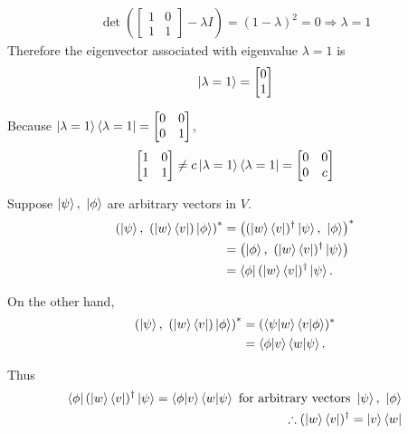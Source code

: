 \begin{align*}
	\det \left(\begin{bmatrix}
	1 & 0 \\ 
	1 & 1
	\end{bmatrix} - \lambda I \right) = (1 - \lambda)^2 = 0 \Rightarrow \lambda = 1
\end{align*}
Therefore the eigenvector associated with eigenvalue $\lambda = 1$ is
\begin{align*}
	\ket{\lambda = 1} = \begin{bmatrix}
	0 \\ 
	1
	\end{bmatrix}
\end{align*}

Because $\ket{\lambda = 1}\bra{\lambda = 1} = \begin{bmatrix}
0 & 0 \\ 
0 & 1
\end{bmatrix}$,
\begin{align*}
	\begin{bmatrix}
	1 & 0 \\ 
	1 & 1
	\end{bmatrix} \neq c\ket{\lambda = 1}\bra{\lambda = 1} = \begin{bmatrix}
	0 & 0 \\ 
	0 & c
	\end{bmatrix}
\end{align*}



Suppose $\ket{\psi},\ \ket{\phi}$ are arbitrary vectors in $V$.
\begin{align*}
	\left(\ket{\psi},\ (\ket{w}\bra{v}) \ket{\phi}\right)^* &=
	\left((\ket{w}\bra{v})^\dagger \ket{\psi},\  \ket{\phi}\right)^*\\
	&= \left(\ket{\phi},\ (\ket{w}\bra{v})^\dagger \ket{\psi} \right)\\
	&= \bra{\phi} (\ket{w}\bra{v})^\dagger \ket{\psi}.
\end{align*}

On the other hand,
\begin{align*}
	\left(\ket{\psi},\ (\ket{w}\bra{v}) \ket{\phi}\right)^*
	&= (\braket{\psi | w} \braket{v | \phi})^*\\
	&= \braket{\phi | v} \braket{w | \psi}.
\end{align*}

Thus
\begin{align*}
	\bra{\phi} (\ket{w}\bra{v})^\dagger \ket{\psi} = \braket{\phi | v} \braket{w | \psi} \text{ for arbitrary vectors } \ket{\psi},\ \ket{\phi}\\
	\therefore (\ket{w}\bra{v})^\dagger = \ket{v}\bra{w}
\end{align*}


